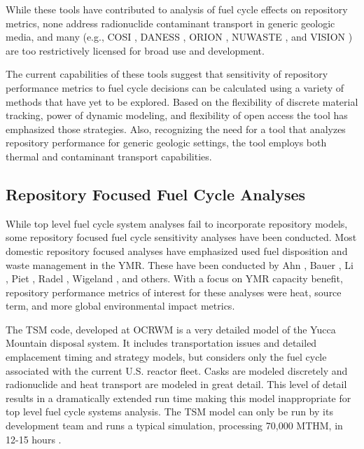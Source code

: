 While these tools have contributed to analysis of fuel cycle effects on 
repository metrics, none address radionuclide contaminant transport in generic 
geologic media, and many (e.g.,
\gls{COSI} \cite{boucher_international_2010},
\gls{DANESS} \cite{yacout_daness_2011,van_den_durpel_daness:_2006}, 
ORION \cite{gregg_orion_2011},
\gls{NUWASTE} \cite{abkowitz_nuclear_2010}, and
\gls{VISION} \cite{yacout_vision_2006, wilson_comparing_2011, radel_repository_2007, boucher_international_2010}
) are too restrictively licensed for broad use and development. 


The current capabilities of these tools suggest that sensitivity of repository 
performance metrics to fuel cycle decisions can be calculated using a variety of 
methods that have yet to be explored. Based on the flexibility of discrete material 
tracking, power of dynamic modeling, and flexibility of open access the \Cyder 
tool has emphasized those strategies. Also, recognizing the need for a tool 
that analyzes repository performance for generic geologic settings, the \Cyder tool 
employs both thermal and contaminant transport capabilities.

\subsection{Repository Focused Fuel Cycle Analyses}

While top level fuel cycle system analyses fail to incorporate repository 
models, some repository focused fuel cycle sensitivity analyses have been conducted. 
Most domestic repository focused analyses have emphasized used fuel disposition and
waste management in the \gls{YMR}. These have been conducted by
Ahn \cite{ahn_environmental_2007}, 
Bauer \cite{bauer_geologic_2007}, 
Li \cite{li_examining_2007}, 
Piet \cite{piet_which_2007}, 
Radel \cite{radel_determination_2007}, 
Wigeland \cite{wigeland_criteria_2006,wigeland_separations_2006}, 
and others. With a focus on \gls{YMR} capacity benefit, 
repository performance metrics of interest for these analyses were heat, source 
term, and more global environmental impact metrics.  

The \gls{TSM} code, 
developed at \gls{OCRWM} is a very detailed model of the Yucca Mountain disposal 
system. It includes transportation issues and detailed emplacement timing and 
strategy models, but considers only the fuel cycle associated with the current  
U.S.  reactor fleet. Casks are modeled discretely and radionuclide and heat transport 
are modeled in great detail.  This level of detail results in a dramatically extended
run time making this model inappropriate for top level fuel cycle systems analysis. 
The \gls{TSM} model can only be run by its development team and runs a typical 
simulation, processing 70,000 MTHM, in 12-15 hours \cite{turner_discrete_2010}. 

